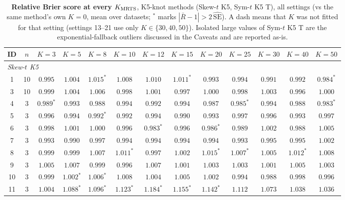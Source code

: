 \begin{table}[p]
\centering\footnotesize
\setlength{\tabcolsep}{3.5pt}
\caption{\textbf{Relative Brier score at every $K_{\mathrm{MRTS}}$}, K5-knot methods (Skew-$t$ K5, Sym-$t$ K5 T), all settings (vs the same method's own $K=0$, mean over datasets; $^{*}$ marks $|\bar R - 1| > 2\,\widehat{\mathrm{SE}}$). A dash means that $K$ was not fitted for that setting (settings 13--21 use only $K \in \{30,40,50\}$). Isolated large values of Sym-$t$ K5 T are the exponential-fallback outliers discussed in the Caveats and are reported as-is.}
\label{tab:brierKb}
\begin{tabular}{ccccccccccccc}
\toprule
ID & $n$ & $K{=}3$ & $K{=}5$ & $K{=}8$ & $K{=}10$ & $K{=}12$ & $K{=}15$ & $K{=}20$ & $K{=}25$ & $K{=}30$ & $K{=}40$ & $K{=}50$ \\
\midrule
\multicolumn{13}{l}{\emph{Skew-$t$ K5}} \\[1pt]
1 & 10 & $0.995$ & $1.004$ & $1.015^{*}$ & $1.008$ & $1.010$ & $1.011^{*}$ & $0.993$ & $0.994$ & $0.991$ & $0.992$ & $0.984^{*}$ \\
3 & 10 & $0.999$ & $1.004$ & $1.006$ & $0.998$ & $1.001$ & $0.997$ & $1.000$ & $0.998$ & $1.003$ & $0.996$ & $1.000$ \\
4 & 3 & $0.989^{*}$ & $0.993$ & $0.988$ & $0.994$ & $0.992$ & $0.994$ & $0.987$ & $0.985^{*}$ & $0.994$ & $0.988$ & $0.983^{*}$ \\
5 & 3 & $0.996$ & $0.994$ & $0.992^{*}$ & $0.992$ & $0.994$ & $0.990$ & $0.993$ & $0.997$ & $0.996$ & $0.993$ & $0.997$ \\
6 & 3 & $0.998$ & $1.001$ & $1.000$ & $0.996$ & $0.983^{*}$ & $0.996$ & $0.986^{*}$ & $0.989$ & $1.002$ & $0.988$ & $1.005$ \\
7 & 3 & $0.993$ & $0.990$ & $0.997$ & $0.994$ & $0.994$ & $0.994$ & $0.994$ & $0.993$ & $0.995$ & $0.995$ & $1.002$ \\
8 & 3 & $0.999$ & $0.999$ & $1.007$ & $1.011^{*}$ & $0.997$ & $1.002$ & $1.015^{*}$ & $1.007^{*}$ & $1.005$ & $1.012^{*}$ & $1.008$ \\
9 & 3 & $1.005$ & $1.007$ & $0.999$ & $0.996$ & $1.007$ & $1.001$ & $1.003$ & $1.003$ & $1.001$ & $1.005$ & $1.003$ \\
10 & 3 & $0.999$ & $1.002^{*}$ & $1.006^{*}$ & $1.008$ & $1.004$ & $1.005$ & $1.002$ & $0.994$ & $0.988$ & $0.998$ & $0.996$ \\
11 & 3 & $1.004$ & $1.088^{*}$ & $1.096^{*}$ & $1.123^{*}$ & $1.184^{*}$ & $1.155^{*}$ & $1.142^{*}$ & $1.112$ & $1.073$ & $1.038$ & $1.036$ \\

\end{tabular}
\end{table}
